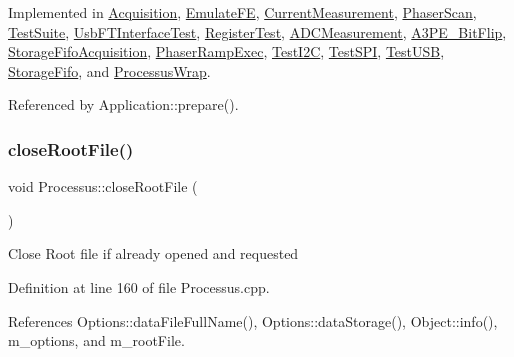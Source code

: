 Implemented in \hyperlink{classAcquisition_a4b1b690ef27f20b3e1ad9383f2f57628}{Acquisition}, \hyperlink{classEmulateFE_a9a704d0081a275410d19071a006f1a80}{Emulate\+FE}, \hyperlink{classCurrentMeasurement_a7722435fcc404fe4761c3fa96f3b6338}{Current\+Measurement}, \hyperlink{classPhaserScan_a4c842f4bda17fb8907c51efc0ccb9d43}{Phaser\+Scan}, \hyperlink{classTestSuite_a949558c82561fd2b3548f0d050accab8}{Test\+Suite}, \hyperlink{classUsbFTInterfaceTest_af4eae62d10c30e060d19aa48621ffb54}{Usb\+F\+T\+Interface\+Test}, \hyperlink{classRegisterTest_a05c7318198562df874c8d7ab5d0e9f89}{Register\+Test}, \hyperlink{classADCMeasurement_a6e34c2b4e3451f1fd128d213723ab1b9}{A\+D\+C\+Measurement}, \hyperlink{classA3PE__BitFlip_a444f2b4fd5211e457105f13d19795211}{A3\+P\+E\+\_\+\+Bit\+Flip}, \hyperlink{classStorageFifoAcquisition_aab797010fd3efe7ef2c4a6e6ba4e87c2}{Storage\+Fifo\+Acquisition}, \hyperlink{classPhaserRampExec_a2586b2209d381c5b82a13dc2f997925f}{Phaser\+Ramp\+Exec}, \hyperlink{classTestI2C_a52b8f5f8203ebea02d0cd73be029de23}{Test\+I2C}, \hyperlink{classTestSPI_afbca7dd9802d226ee1fec8475ff5f127}{Test\+S\+PI}, \hyperlink{classTestUSB_a109094c177ccaaa224b514c118c93ce7}{Test\+U\+SB}, \hyperlink{classStorageFifo_a80b534eb6d81a3b570f6957d6a932987}{Storage\+Fifo}, and \hyperlink{structProcessusWrap_a6582297a477b1cd1594f90a80691fca3}{Processus\+Wrap}.



Referenced by Application\+::prepare().

\mbox{\label{classProcessus_a2f3c41e99da4c738ea3d8f7b0d20a665}} 
\subsubsection{\texorpdfstring{close\+Root\+File()}{closeRootFile()}}
{\footnotesize\ttfamily void Processus\+::close\+Root\+File (\begin{DoxyParamCaption}{ }\end{DoxyParamCaption})}

Close Root file if already opened and requested 

Definition at line 160 of file Processus.\+cpp.



References Options\+::data\+File\+Full\+Name(), Options\+::data\+Storage(), Object\+::info(), m\+\_\+options, and m\+\_\+root\+File.




